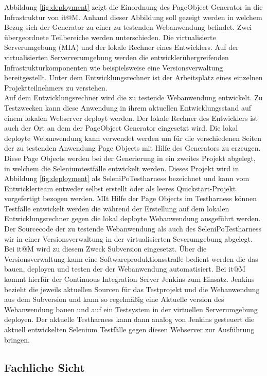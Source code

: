 Abbildung \ref{fig:deployment} zeigt die Einordnung des PageObject Generator in die Infrastruktur von it@M. Anhand dieser Abbildung soll gezeigt werden in welchem Bezug sich der Generator zu einer zu testenden Webanwendung befindet.
Zwei übergeordnete Teilbereiche werden unterschieden. Die virtualisierte Serverumgebung (MIA) und der lokale Rechner eines Entwicklers. Auf der virtualisierten Serververumgebung werden die entwicklerübergreifenden Infrastrukturkomponenten wie beispielsweise eine Versionsverwaltung bereitgestellt. Unter dem Entwicklungsrechner ist der Arbeitsplatz eines einzelnen Projektteilnehmers zu verstehen.\\
Auf dem Entwicklungsrechner wird die zu testende Webanwendung entwickelt. Zu Testzwecken kann diese Anwendung in ihrem aktuellen Entwicklungsstand auf einem lokalen Webserver deployt werden.
Der lokale Rechner des Entwicklers ist auch der Ort an dem der PageObject Generator eingesetzt wird. Die lokal deployte Webanwendung kann verwendet werden um für die verschiedenen Seiten der zu testenden Anwendung Page Objects mit Hilfe des Generators zu erzeugen. Diese Page Objects werden bei der Generierung in ein zweites Projekt abgelegt, in welchem die Seleniumtestfälle entwickelt werden. Dieses Projekt wird in Abbildung \ref{fig:deployment} als SeleniPoTestharness bezeichnet und kann vom Entwicklerteam entweder selbst erstellt oder als leeres Quickstart-Projekt vorgefertigt bezogen werden. MIt Hilfe der Page Objects im Testharness können Testfälle entwickelt werden die während der Erstellung auf dem lokalen Entwicklungsrechner gegen die lokal deployte Webanwendung ausgeführt werden.
Der Sourcecode der zu testende Webanwendung als auch des SeleniPoTestharness wir in einer Versionsverwaltung in der virtualisierten Severumgebung abgelegt. Bei it@M wird zu diesem Zweck Subversion eingesetzt. Über die Versionsverwaltung kann eine Softwareproduktionsstraße bedient werden die das bauen, deployen und testen der der Webanwendung automatisiert. Bei it@M kommt hierfür der Continuous Integration Server Jenkins zum Einsatz. Jenkins bezieht die jeweils aktuellen Sourcen für das Testprojekt und die Webanwendung aus dem Subversion und kann so regelmäßig eine Aktuelle version des Webanwendung bauen und auf ein Testsystem in der virtuellen Serverumgebung deployen. Der aktuelle Testharness kann dann analog von Jenkins gesteuert die aktuell entwickelten Selenium Testfälle gegen diesen Webserver zur Ausführung bringen.



\subsection{Fachliche Sicht}
\label{sec:fachliche_sicht}

